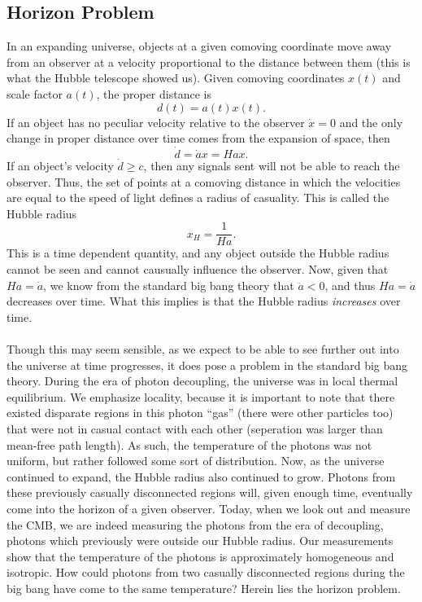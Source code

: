 \documentclass[10pt,letterpaper]{article}
\begin{document}
\subsection{Horizon Problem}
In an expanding universe, objects at a given comoving coordinate move away from an observer at a velocity proportional to the distance between them (this is what the Hubble telescope showed us). Given comoving coordinates $x(t)$ and scale factor $a(t)$, the proper distance is 
\[
	d(t) = a(t)x(t).
\]
If an object has no peculiar velocity relative to the observer $\dot x =0$ and the only change in proper distance over time comes from the expansion of space, then
\[
	\dot d= \dot a x = Ha x.
\]
If an object's velocity $\dot d\ge c$, then any signals sent will not be able to reach the observer. Thus, the set of points at a comoving distance in which the velocities are equal to the speed of light defines a radius of casuality. This is called the Hubble radius
\[
	x_H = \frac1{Ha}.
\]
This is a time dependent quantity, and any object outside the Hubble radius cannot be seen and cannot causually influence the observer. 
Now, given that $Ha = \dot a$, we know from the standard big bang theory that $\ddot a <0$, and thus $Ha=\dot a$ decreases over time. What this implies is that the Hubble radius \emph{increases} over time.  
\\ \\
Though this may seem sensible, as we expect to be able to see further out into the universe at time progresses, it does pose a problem in the standard big bang theory. During the era of photon decoupling, the universe was in local thermal equilibrium. We emphasize locality, because it is important to note that there existed disparate regions in this photon ``gas'' (there were other particles too) that were not in casual contact with each other (seperation was larger than mean-free path length). As such, the temperature of the photons was not uniform, but rather followed some sort of distribution. Now, as the universe continued to expand, the Hubble radius also continued to grow. Photons from these previously casually disconnected regions will, given enough time, eventually come into the horizon of a given observer. Today, when we look out and measure the CMB, we are indeed measuring the photons from the era of decoupling, photons which previously were outside our Hubble radius. Our measurements show that the temperature of the photons is approximately homogeneous and isotropic. How could photons from two casually disconnected regions during the big bang have come to the same temperature? Herein lies the horizon problem. 
\end{document}
